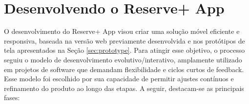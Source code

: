 \documentclass[12pt]{article}
\begin{document}


\section{Desenvolvendo o Reserve+ App} \label{sec:preliminary-version}

O desenvolvimento do Reserve+ App visou criar uma solução móvel eficiente e responsiva, baseada na versão web previamente desenvolvida e nos protótipos de tela apresentados na Seção \ref{sec:prototype}. Para atingir esse objetivo, o processo seguiu o modelo de desenvolvimento evolutivo/interativo, amplamente utilizado em projetos de software que demandam flexibilidade e ciclos curtos de feedback. Esse modelo foi escolhido por sua capacidade de permitir ajustes contínuos e refinamento do produto ao longo das etapas. A seguir, destacam-se as principais fases:
\end{document}
